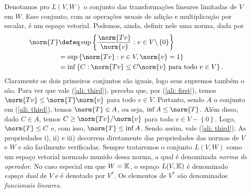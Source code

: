 Denotamos pro \( L(V, W) \) o conjunto das transformações lineares limitadas de \( V \) em \( W \).
Esse conjunto, com as operações usuais de adição e multiplicação por escalar, é um espaço vetorial.
Podemos, ainda, definir nele uma norma, dada por
\begin{align}
    \norm{ T } &\defeq \sup \left\{ \frac{ \norm{ Tv } }{ \norm{ v } } : v \in V \backslash \left\{ 0 \right\} \right\} \label{ali: first} \\
    &= \sup \left\{ \norm{ Tv } : v \in V, \norm{ v } = 1 \right\} \label{ali: sec} \\
    &= \inf \left\{ C : \norm{ Tv } \leq C \norm{ v } \text{ para todo } v \in V \right\}
    \label{ali: third}
.\end{align}
Claramente os dois primeiros conjuntos são iguais, logo seus supremos também o são.
Para ver que vale (\ref{ali: third}), perceba que, por (\ref{ali: first}), temos \( \norm{ Tv } \leq \norm{ T } \norm{ v } \) para todo \( v \in V \).
Portanto, sendo \( A \) o conjunto em (\ref{ali: third}), temos \( \norm{ T } \in A \), ou seja, \( \inf A \leq \norm{ T } \).
Além disso, dado \( C \in A \), temos \( C \geq \norm{ Tv } / \norm{ v } \) para todo \( v \in V - \left\{ 0 \right\} \).
Logo, \( \norm{ T } \leq C \) e, com isso, \( \norm{ T } \leq \inf A \).
Sendo assim, vale (\ref{ali: third}).
As propriedades i), ii) e iii) decorrem diretamente das propriedades das normas de \( V \) e \( W \) e são facilmente verificadas.
Sempre trataremos o conjunto \( L(V, W) \) como um espaço vetorial normado munido dessa norma, a qual é denominada \emph{norma de operador}. 
No caso especial em que \( W = \mathbb{K} \),
o espaço \( L(V, \mathbb{K}) \) é denominado \emph{espaço dual} de \( V \) e é denotado por \( V^{ * } \).
Os elementos de \( V^{ * } \) são denominados \emph{funcionais lineares}.

